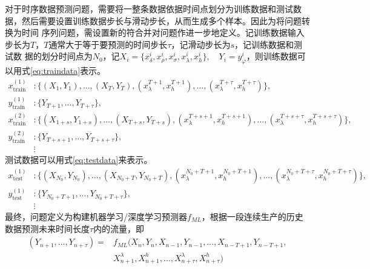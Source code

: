 对于时序数据预测问题，需要将一整条数据依据时间点划分为训练数据和测试数据，然后需要设置训练数据步长与滑动步长，从而生成多个样本。因此为将问题转换为时间
序列问题，需设置新的符合并对问题作进一步地定义。记训练数据输入步长为$T$，$T$通常大于等于要预测的时间步长$\tau$，记滑动步长为$s$，记训练数据和测试数
据的划分时间点为$N_0$，记${X_i} = \{x^i_\delta, x^i_\rho, x^i_\sigma, x^i_\lambda, x^i_h\}, \quad {Y_i} = y^i_\varphi$，则训练数据可以用式\eqref{eq:traindata}表示。
\begin{equation}
    \begin{aligned}
    x_{\text{train}}^{(1)} &: \{ (X_1, Y_1), ..., (X_{T}, Y_{T}), (x^{T+1}_{\lambda }, x^{T+1}_{h }), ..., (x^{T+\tau}_{\lambda }, x^{T+\tau}_{h}) \}, \\
    y_{\text{train}}^{(1)} &: \{Y_{T+1}, ... ,Y_{T+\tau}\}, \\
    x_{\text{train}}^{(2)} &: \{ (X_{1+s}, Y_{1+s}), ..., (X_{T+s}, Y_{T+s}), (x^{T+s+1}_\lambda , x^{T+s+1}_h ), ..., (x^{T+s+\tau}_{\lambda }, x^{T+s+\tau}_{h}) \}, \\
    y_{\text{train}}^{(2)} &: \{Y_{T+s+1}, ... ,Y_{T+s+\tau}\}, \\
    & \vdots
    \end{aligned}
    \label{eq:traindata}
\end{equation}
测试数据可以用式\eqref{eq:testdata}来表示。
\begin{equation}
    \begin{aligned}
    x_{\text{test}}^{(1)} &: \{ (X_{N_0}, Y_{N_0}), ..., (X_{N_0 + T}, Y_{N_0 + T}), (x^{N_0 + T+1}_{\lambda }, x^{N_0 + T+1}_{h }), ..., (x^{N_0 + T+\tau}_{\lambda }, x^{N_0 + T+\tau}_{h}) \}, \\
    y_{\text{test}}^{(1)} &: \{Y_{N_0 + T+1}, ... ,Y_{N_0 + T+\tau}\}, \\
    & \vdots
    \end{aligned}
    \label{eq:testdata}
\end{equation}
最终，问题定义为构建机器学习/深度学习预测器$f_{ML }$，根据一段连续生产的历史数据预测未来时间长度$\tau$内的流量，即
\begin{equation}
    \begin{aligned}
        (Y_{n+1}, \ldots, Y_{n+\tau}) = &f_{ML}(X_n, Y_n, X_{n-1}, Y_{n-1}, \ldots, X_{n-T+1}, Y_{n-T+1}, \\
                                        &X_{n+1}^{\lambda}, X_{n+1}^{h}, \ldots, X_{n+\tau}^{\lambda}, X_{n+\tau}^{h})
    \end{aligned}        
\end{equation}

